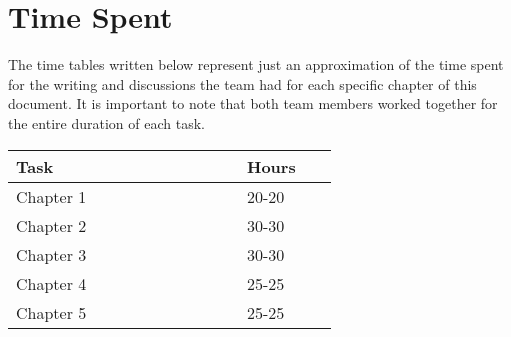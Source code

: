 \section{Time Spent}
The time tables written below represent just an approximation of the time spent for the writing and discussions the team had for each specific chapter of this document.
It is important to note that both team members worked together for the entire duration of each task.
\vspace{10mm}
\vspace{1mm}
\begin{center}
    \begin{tabular}{@{}p{0.5\linewidth} p{0.2\linewidth}@{}}
        \hline
        \textbf{Task} & \textbf{Hours} \\ \hline
        Chapter 1& 20-20 \\ \hline
        Chapter 2 & 30-30 \\ \hline
        Chapter 3 & 30-30 \\ \hline
        Chapter 4 & 25-25 \\ \hline
        Chapter 5 & 25-25 \\ \hline
    \end{tabular}
\end{center}

